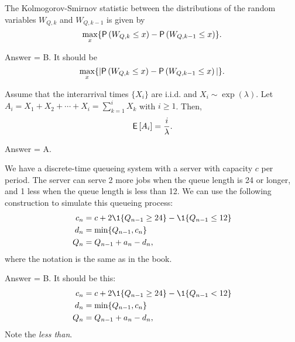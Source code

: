 \begin{exercise}[201803]
The Kolmogorov-Smirnov statistic between the distributions of the random variables $W_{Q,k}$ and $W_{Q,k-1}$ is given by
\begin{equation*}
  \max_x\{ \P{W_{Q,k}\leq x} - \P{W_{Q,k-1}\leq x}\}.
\end{equation*}

\begin{solution}
Answer = B. It should be
\begin{equation*}
  \max_x\{|\P{W_{Q,k}\leq x} - \P{W_{Q,k-1}\leq x}|\}.
\end{equation*}

\end{solution}
\end{exercise}


\begin{exercise}[201804]
    Assume that the interarrival times $\{X_i\}$ are i.i.d. and
    $X_i\sim\exp(\lambda)$. Let
    $A_i=X_1+X_2+\cdots+X_i=\sum_{k=1}^i X_k$ with $i\geq 1$. Then,
 \begin{equation*}
\,\mathsf{E}\left[A_i\right] = \frac i\lambda.
 \end{equation*}
\begin{solution}
Answer = A.
\end{solution}
\end{exercise}

\begin{exercise}[201804]
We have a discrete-time queueing system with a server with capacity $c$ per period. The server can serve 2 more jobs
when the queue length is 24 or longer, and  1 less when the queue length is less than 12.  
We can use the following construction  to simulate this queueing process:
\begin{align*}
c_n &= c + 2\1{Q_{n-1} \geq 24} - \1{Q_{n-1} \leq 12}\\
  d_n &= \min\{Q_{n-1}, c_n\} \\
Q_n &= Q_{n-1} + a_n - d_n,
\end{align*}
where the notation is the same as in the book.
\begin{solution}
Answer = B. It should be this:
\begin{align*}
c_n &= c + 2\1{Q_{n-1} \geq 24} - \1{Q_{n-1} < 12}\\
  d_n &= \min\{Q_{n-1}, c_n\} \\
Q_n &= Q_{n-1} + a_n - d_n,
\end{align*}
Note the \emph{less than}.
\end{solution}
\end{exercise}

